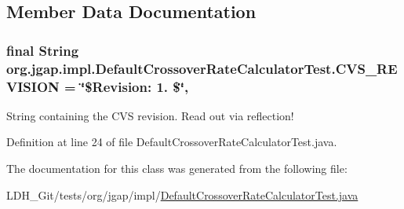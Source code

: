 \subsection{Member Data Documentation}
\hypertarget{classorg_1_1jgap_1_1impl_1_1_default_crossover_rate_calculator_test_ad93979062e772f3b5440333b74ad4263}{
\subsubsection[{C\-V\-S\-\_\-\-R\-E\-V\-I\-S\-I\-O\-N}]{\setlength{\rightskip}{0pt plus 5cm}final String org.\-jgap.\-impl.\-Default\-Crossover\-Rate\-Calculator\-Test.\-C\-V\-S\-\_\-\-R\-E\-V\-I\-S\-I\-O\-N = \char`\"{}\$Revision\-: 1. \$\char`\"{}\hspace{0.3cm}{\ttfamily [static]}, {\ttfamily [private]}}}\label{classorg_1_1jgap_1_1impl_1_1_default_crossover_rate_calculator_test_ad93979062e772f3b5440333b74ad4263}
String containing the C\-V\-S revision. Read out via reflection! 

Definition at line 24 of file Default\-Crossover\-Rate\-Calculator\-Test.\-java.



The documentation for this class was generated from the following file\-:\begin{DoxyCompactItemize}
\item 
L\-D\-H\-\_\-\-Git/tests/org/jgap/impl/\hyperlink{_default_crossover_rate_calculator_test_8java}{Default\-Crossover\-Rate\-Calculator\-Test.\-java}\end{DoxyCompactItemize}
